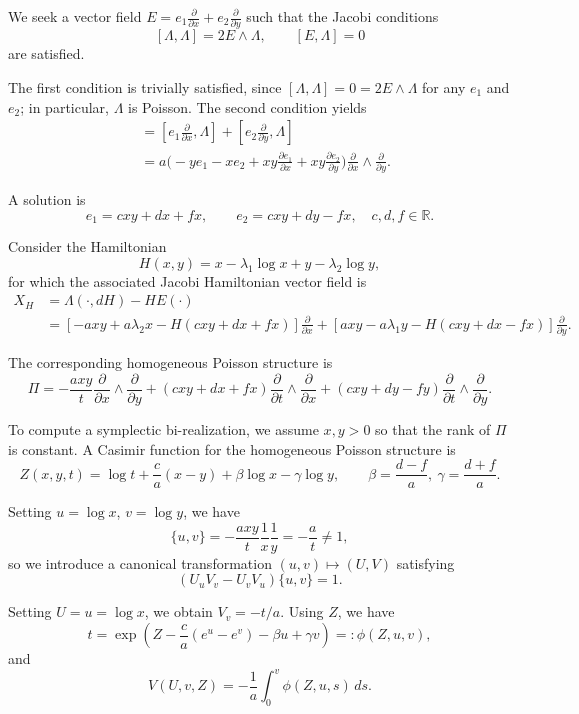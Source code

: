 \documentclass[12pt,english]{article}
\begin{document}
We seek a vector field $E = e_1 \frac{\partial}{\partial x} + e_2 \frac{\partial}{\partial y}$ such that the Jacobi conditions
\[
[\Lambda, \Lambda] = 2 E \wedge \Lambda, \qquad [E, \Lambda] = 0
\]
are satisfied.  

The first condition is trivially satisfied, since $[\Lambda, \Lambda] = 0 = 2 E \wedge \Lambda$ for any $e_1$ and $e_2$; in particular, $\Lambda$ is Poisson. The second condition yields
\begin{align*}
[E, \Lambda] &= \left[e_1 \frac{\partial}{\partial x}, \Lambda \right] + \left[e_2 \frac{\partial}{\partial y}, \Lambda \right] \\
&= a \Big(-y e_1 - x e_2 + xy \frac{\partial e_1}{\partial x} + xy \frac{\partial e_2}{\partial y} \Big) \frac{\partial}{\partial x} \wedge \frac{\partial}{\partial y}.
\end{align*}

A solution is 
\[
e_1 = c xy + dx + fx, \qquad e_2 = c xy + dy - fx, \quad c,d,f \in \mathbb{R}.
\]

Consider the Hamiltonian 
\[
H(x,y) = x - \lambda_1 \log x + y - \lambda_2 \log y,
\]
for which the associated Jacobi Hamiltonian vector field is
\begin{align*}
X_H &= \Lambda(\cdot,dH) - H E(\cdot) \\
&= \left[-axy + a \lambda_2 x - H (cxy + dx + fx) \right] \frac{\partial}{\partial x} + \left[ axy - a \lambda_1 y - H (cxy + dx - fx) \right] \frac{\partial}{\partial y}.
\end{align*}

The corresponding homogeneous Poisson structure is
\[
\Pi = -\frac{a xy}{t} \frac{\partial}{\partial x} \wedge \frac{\partial}{\partial y} + (cxy + dx + fx) \frac{\partial}{\partial t} \wedge \frac{\partial}{\partial x} + (cxy + dy - fy) \frac{\partial}{\partial t} \wedge \frac{\partial}{\partial y}.
\]

To compute a symplectic bi-realization, we assume $x, y > 0$ so that the rank of $\Pi$ is constant. A Casimir function for the homogeneous Poisson structure is
\[
Z(x,y,t) = \log t + \frac{c}{a} (x-y) + \beta \log x - \gamma \log y, \qquad \beta = \frac{d-f}{a}, \ \gamma = \frac{d+f}{a}.
\]

Setting $u = \log x$, $v = \log y$, we have
\[
\{u,v\} = -\frac{axy}{t} \frac{1}{x} \frac{1}{y} = -\frac{a}{t} \neq 1,
\]
so we introduce a canonical transformation $(u,v) \mapsto (U,V)$ satisfying
\[
(U_u V_v - U_v V_u) \{u,v\} = 1.
\]

Setting $U = u = \log x$, we obtain $V_v = -t/a$. Using $Z$, we have
\[
t = \exp\left( Z - \frac{c}{a} (e^u - e^v) - \beta u + \gamma v \right) =: \phi(Z,u,v),
\]
and
\[
V(U,v,Z) = -\frac{1}{a} \int_0^v \phi(Z,u,s) \, ds.
\]
\end{document}
